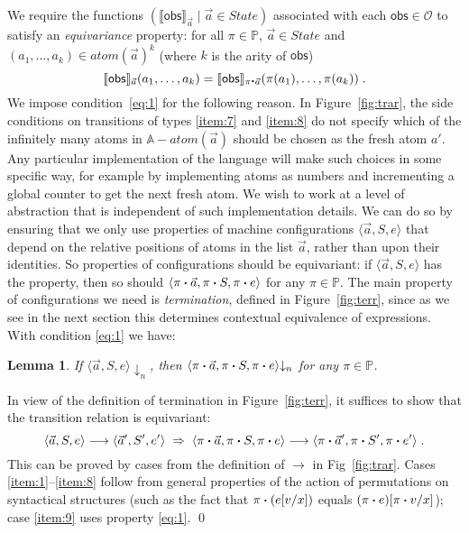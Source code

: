 \documentclass{LMCS}
\theoremstyle{plain}
\newtheorem{lemma}[thm]{Lemma}
\theoremstyle{definition}
\newcommand{\act}{\mathbin{\mbox{\boldmath$\cdot$}}}
\newcommand{\atm}[1][a]{#1}
\newcommand{\Atom}{\mathbb{A}}
\newcommand{\atoms}{\mathit{atom}}
\newcommand{\config}[3]{\langle#1, #2, #3\rangle}
\newcommand{\den}[1]{\llbracket#1\rrbracket}\newcommand{\DIVERGE}{\kw{diverge}}
\renewcommand{\exp}[1][e]{#1}
\newcommand{\imp}{\Rightarrow}
\newcommand{\kw}[1]{\mathsf{#1}}
\newcommand{\Obs}{\mathcal{O}}
\newcommand{\OBS}[1][obs]{\kw{#1}}
\newcommand{\Perm}{\mathbb{P}}
\newcommand{\State}{\mathit{State}}
\newcommand{\s}[1][a]{\vec{#1}}
\newcommand{\stk}[1][S]{#1}
\newcommand{\sub}[2]{{[#2/#1]}}
\newcommand{\terminates}[1][]{{\downarrow_{#1}}}
\newcommand{\trans}{\longrightarrow}
\newcommand{\val}[1][v]{#1}
\newcommand{\vid}[1][x]{#1}
\begin{document}
We require the functions $(\den{\OBS}_{\s}\mid\s\in\State)$ associated
with each $\OBS\in\Obs$ to satisfy an \emph{equivariance} property:
for all $\pi\in\Perm$, $\s\in\State$ and
$(\atm_1,\ldots,\atm_k)\in\atoms(\s)^k$ (where $k$ is the arity of
$\OBS$)
\begin{equation}
  \label{eq:1}
  \den{\OBS}_{\s}(\atm_1,\ldots,\atm_k) = 
  \den{\OBS}_{\pi\act\s}(\pi(\atm_1),\ldots,\pi(\atm_k))\;.
\end{equation}
We impose condition~\eqref{eq:1} for the following reason.  In
Figure~\ref{fig:trar}, the side conditions on transitions of types
\ref{item:7} and \ref{item:8} do not specify which of the infinitely
many atoms in $\Atom-\atoms(\s)$ should be chosen as the fresh atom
$\atm'$. Any particular implementation of the language will make such
choices in some specific way, for example by implementing atoms as
numbers and incrementing a global counter to get the next fresh atom.
We wish to work at a level of abstraction that is independent of such
implementation details. We can do so by ensuring that we only use
properties of machine configurations $\config{\s}{\stk}{\exp}$ that
depend on the relative positions of atoms in the list $\s$, rather
than upon their identities.  So properties of configurations should be
equivariant: if $\config{\s}{\stk}{\exp}$ has the property, then so
should $\config{\pi\act\s}{\pi\act\stk}{\pi\act\exp}$ for any
$\pi\in\Perm$. The main property of configurations we need is
\emph{termination}, defined in Figure~\ref{fig:terr}, since as we see
in the next section this determines contextual equivalence of
expressions. With condition \eqref{eq:1} we have:

\begin{lemma}
  \label{lem:ter-equivar}
  If $\config{\s}{\stk}{\exp}\terminates[n]$, then
  $\config{\pi\act\s}{\pi\act\stk}{\pi\act\exp}\terminates[n]$ for any
  $\pi\in\Perm$.
\end{lemma}
\proof
  In view of the definition of termination in Figure~\ref{fig:terr}, it
  suffices to show that the transition relation is equivariant:
  \[
    {\config{\s}{\stk}{\exp}\trans
      \config{\s'}{\stk'}{\exp'}} \;\imp\;
    {\config{\pi\act\s}{\pi\act\stk}{\pi\act\exp}\trans
      \config{\pi\act\s'}{\pi\act\stk'}{\pi\act\exp'}}\;.
  \]
  This can be proved by cases from the definition of $\trans$ in
  Fig~\ref{fig:trar}.  Cases \ref{item:1}--\ref{item:8} follow from
  general properties of the action of permutations on syntactical
  structures (such as the fact that $\pi\act(e\sub{\vid}{\val})$ equals
  $(\pi\act e)\sub{\vid}{\pi\act\val}$); case \ref{item:9}
  uses property \eqref{eq:1}.
\qed
\end{document}
